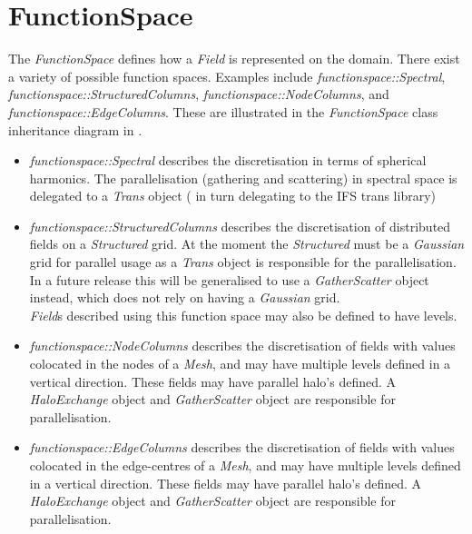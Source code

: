 \section{FunctionSpace} \label{s:functionspace}
%
The \emph{FunctionSpace} defines how a \emph{Field} is represented on the
domain. There exist a variety of possible function spaces. Examples include 
\emph{functionspace::Spectral}, \emph{functionspace::StructuredColumns}, \emph{functionspace::NodeColumns}, and \emph{functionspace::EdgeColumns}.
These are illustrated in the \emph{FunctionSpace} class inheritance diagram in .
\begin{itemize}
  \item \emph{functionspace::Spectral} describes the discretisation in terms of         spherical harmonics. The parallelisation (gathering and scattering) in
        spectral space is delegated to a \emph{Trans} object ( in turn
        delegating to the IFS trans library)
  \item \emph{functionspace::StructuredColumns} describes the discretisation
        of distributed fields on a \emph{Structured} grid. At the moment the
        \emph{Structured} must be a \emph{Gaussian} grid for parallel
        usage as a \emph{Trans} object is responsible for the parallelisation.
        In a future release this will be generalised to use a 
        \emph{GatherScatter} object instead, which does not rely on having a 
        \emph{Gaussian} grid.\\
        \emph{Field}s described using this function space may also be defined  
        to have levels.
  \item \emph{functionspace::NodeColumns} describes the discretisation of fields
        with values colocated in the nodes of a \emph{Mesh}, and may have
        multiple levels defined in a vertical direction. These fields may have
        parallel halo's defined. A \emph{HaloExchange} object and
        \emph{GatherScatter} object are responsible for parallelisation.
  \item \emph{functionspace::EdgeColumns} describes the discretisation of fields
        with values colocated in the edge-centres of a \emph{Mesh}, and may have
        multiple levels defined in a vertical direction. These fields may have
        parallel halo's defined. A \emph{HaloExchange} object and
        \emph{GatherScatter} object are responsible for parallelisation.
\end{itemize}
%
